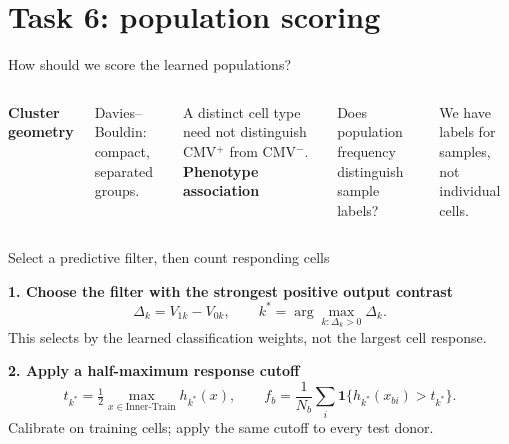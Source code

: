 \documentclass[aspectratio=169,10pt]{beamer}
\newcommand{\slidelabel}{SSBI}
\begin{document}
\renewcommand{\slidelabel}{SSBI · Task 6}
\section{Task 6: population scoring}
\begin{frame}{How should we score the learned populations?}

\begin{columns}[T,onlytextwidth]
\textbf{Cluster geometry}\par
\vspace{2mm}
Davies--Bouldin: compact, separated groups.\par
\vspace{3mm}
A distinct cell type need not distinguish CMV$^+$ from CMV$^-$. 
\textbf{Phenotype association}\par
\vspace{2mm}
Does population frequency distinguish sample labels?\par
\vspace{3mm}
We have labels for samples, not individual cells.
\end{columns}
\vspace{4mm}

\end{frame}

\begin{frame}{Select a predictive filter, then count responding cells}

\textbf{1. Choose the filter with the strongest positive output contrast}
\[\Delta_k=V_{1k}-V_{0k},\qquad k^*=\arg\max_{k:\Delta_k>0}\Delta_k.\]
\small This selects by the learned classification weights, not the largest cell response.
\vspace{2mm}\par
\normalsize\textbf{2. Apply a half-maximum response cutoff}
\[t_{k^*}=\tfrac12\max_{x\in\mathrm{Inner\text{-}Train}}h_{k^*}(x),\qquad
f_b=\frac1{N_b}\sum_i\mathbf1\{h_{k^*}(x_{bi})>t_{k^*}\}.\]
\small Calibrate on training cells; apply the same cutoff to every test donor.

\end{frame}
\end{document}
